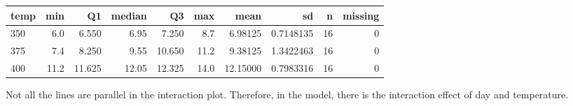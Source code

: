 \documentclass[12pt,]{article}
\begin{document}
\begin{table}[H]
\centering\begingroup\fontsize{8}{10}\selectfont

\begin{tabular}{lrrrrr>{\columncolor[HTML]{EAFAF1}}rrrr}
\toprule
temp & min & Q1 & median & Q3 & max & mean & sd & n & missing\\
\midrule
350 & 6.0 & 6.550 & 6.95 & 7.250 & 8.7 & 6.98125 & 0.7148135 & 16 & 0\\
375 & 7.4 & 8.250 & 9.55 & 10.650 & 11.2 & 9.38125 & 1.3422463 & 16 & 0\\
400 & 11.2 & 11.625 & 12.05 & 12.325 & 14.0 & 12.15000 & 0.7983316 & 16 & 0\\
\bottomrule
\end{tabular}
\endgroup{}
\end{table}

Not all the lines are parallel in the interaction plot. Therefore, in
the model, there is the interaction effect of day and temperature.
\end{document}
